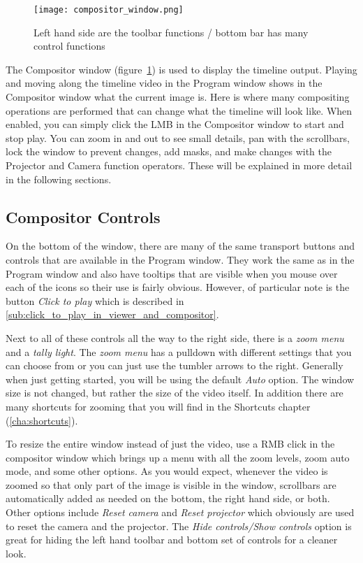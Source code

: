 \begin{figure}[htpb]
    \centering
    \texttt{[image: compositor\_window.png]}
    \caption{Left hand side are the toolbar functions / bottom bar has many control functions}
    \label{fig:compositor_window}
\end{figure}

The Compositor window (figure~\ref{fig:compositor_window}) is used to display the timeline
output.  Playing and moving along the timeline video in the Program window shows in the
Compositor window what the current image is.  Here is where many compositing operations are
performed that can change 
what the timeline will look like.  When enabled, you can simply click the LMB in the Compositor
window to start and stop play.
  You can zoom in and out to 
see small details, pan with the scrollbars, lock the window to prevent changes, add masks,
and make changes with the Projector and Camera function operators. These will be explained
in more detail in the following sections.

\subsection{Compositor Controls}%
\label{sub:compositor_controls}

On the bottom of the window, there are many
of the same transport buttons and controls that are available in the Program window.
They work the same as in the Program window and also have tooltips that are visible 
when you mouse over each of the icons so their use is fairly obvious.  However,
of particular note is the button \textit{Click to play} which is described in
\ref{sub:click_to_play_in_viewer_and_compositor}.

Next to all of these controls all the way to the right side, there is a \textit{zoom menu} and a \textit{tally light}.  The \textit{zoom menu} has a pulldown with different settings that you can choose from
or you can just use the tumbler arrows to the right. Generally when just getting started, you
will be using the default \textit{Auto} option.  The window size is not changed, but rather
the size of the video itself. In addition there are many shortcuts for zooming that you
will find in the Shortcuts chapter (\ref{cha:shortcuts}).

To resize the entire window instead of just the video, use a RMB click in the compositor
window which brings up a menu with all the zoom levels, zoom auto mode, and some other options. 
As you would expect, whenever the video is zoomed so that only part of the image is visible
in the window, scrollbars are automatically added as needed on the bottom, the right hand 
side, or both.
Other options include \emph{Reset camera} and \emph{Reset projector} which obviously are used
to reset the camera and the projector. 
The \emph{Hide controls/Show controls} option is great for hiding the left hand toolbar and
bottom set of controls for a cleaner look. 

